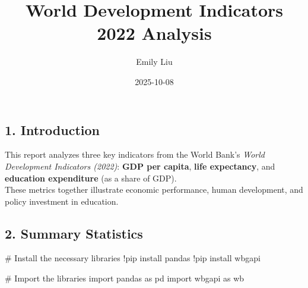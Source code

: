 \documentclass[
  letterpaper,
  DIV=11,
  numbers=noendperiod]{scrartcl}
\title{World Development Indicators 2022 Analysis}
\author{Emily Liu}
\date{2025-10-08}
\newenvironment{Shaded}{\begin{snugshade}}{\end{snugshade}}
\newcommand{\CommentTok}[1]{\textcolor[rgb]{0.37,0.37,0.37}{#1}}
\newcommand{\ImportTok}[1]{\textcolor[rgb]{0.00,0.46,0.62}{#1}}
\newcommand{\NormalTok}[1]{\textcolor[rgb]{0.00,0.23,0.31}{#1}}
\newcommand{\OperatorTok}[1]{\textcolor[rgb]{0.37,0.37,0.37}{#1}}
\begin{document}
\maketitle


\subsection{1. Introduction}\label{introduction}

This report analyzes three key indicators from the World Bank's
\emph{World Development Indicators (2022)}: \textbf{GDP per capita},
\textbf{life expectancy}, and \textbf{education expenditure} (as a share
of GDP).\\
These metrics together illustrate economic performance, human
development, and policy investment in education.

\subsection{2. Summary Statistics}\label{summary-statistics}

\begin{Shaded}
\begin{Highlighting}[]
\CommentTok{\# Install the necessary libraries}
\OperatorTok{!}\NormalTok{pip install pandas}
\OperatorTok{!}\NormalTok{pip install wbgapi}

\CommentTok{\# Import the libraries}
\ImportTok{import}\NormalTok{ pandas }\ImportTok{as}\NormalTok{ pd}
\ImportTok{import}\NormalTok{ wbgapi }\ImportTok{as}\NormalTok{ wb}
\end{Highlighting}
\end{Shaded}
\end{document}
